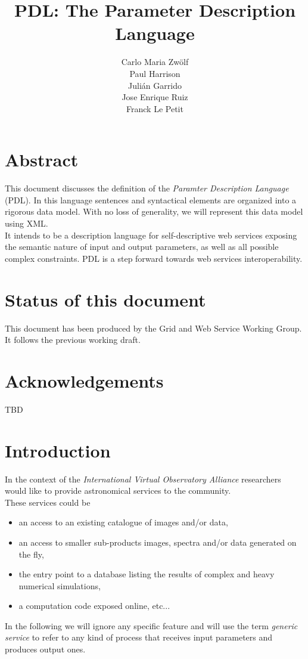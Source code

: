 \documentclass[a4paper,11pt] {ivoa}
\title{PDL: The Parameter Description Language}
\author{Carlo Maria Zw\"olf \\ Paul Harrison \\ Juli\'an Garrido \\ Jose Enrique Ruiz \\ Franck Le Petit}
\date{\pdldate}
\begin{document}
\maketitle
\section*{Abstract}
This document discusses the definition of the  {\it Paramter Description Language} (PDL). In this language sentences and syntactical elements are organized into a rigorous data model. With no loss of generality, we will represent this data model using XML.\\
It intends to be a description language for self-descriptive web services exposing the semantic nature of input and output parameters, as well as all possible complex constraints. PDL is a step forward towards web services interoperability. 
\section{Status of this document}
This document has been produced by the  Grid and Web Service Working Group. It follows the previous working draft.
 
\section*{Acknowledgements}
TBD

\clearpage

\tableofcontents

\newpage

\section{Introduction}

In the context of the {\it International Virtual Observatory Alliance} researchers would like to
provide astronomical services to the community. \\
These services could be
\begin{itemize}
\item  an access to an existing catalogue of images and/or data,
\item an access to smaller sub-products images, spectra and/or data generated on the fly,
\item  the entry point to a database listing the results of complex  and heavy numerical simulations,
\item a computation code exposed online, etc... 
\end{itemize}
In the following we will ignore any specific feature and will use the term {\it generic service} to
refer to any kind of process that receives input parameters and produces output ones.\\
\end{document}
